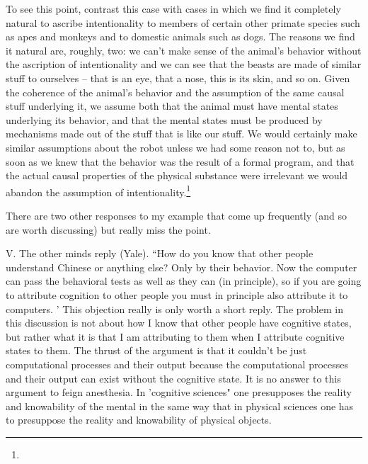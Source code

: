 To see this point, contrast this case with cases in which we find it completely natural to ascribe intentionality to
members of certain other primate species such as apes and monkeys and to domestic animals such as dogs. The
reasons we find it natural are, roughly, two: we can't make sense of the animal's behavior without the ascription
of intentionality and we can see that the beasts are made of similar stuff to ourselves -- that is an eye, that a
nose, this is its skin, and so on. Given the coherence of the animal's behavior and the assumption of the same
causal stuff underlying it, we assume both that the animal must have mental states underlying its behavior, and
that the mental states must be produced by mechanisms made out of the stuff that is like our stuff. We would
certainly make similar assumptions about the robot unless we had some reason not to, but as soon as we knew
that the behavior was the result of a formal program, and that the actual causal properties of the physical
substance were irrelevant we would abandon the assumption of intentionality.\footnote{}

There are two other responses to my example that come up frequently (and so are worth discussing) but really
miss the point.

V. The other minds reply (Yale). ``How do you know that other people understand Chinese or anything else?
Only by their behavior. Now the computer can pass the behavioral tests as well as they can (in principle), so if
you are going to attribute cognition to other people you must in principle also attribute it to computers. '
This objection really is only worth a short reply. The problem in this discussion is not about how I know that
other people have cognitive states, but rather what it is that I am attributing to them when I attribute cognitive
states to them. The thrust of the argument is that it couldn't be just computational processes and their output
because the computational processes and their output can exist without the cognitive state. It is no answer to
this argument to feign anesthesia. In 'cognitive sciences" one presupposes the reality and knowability of the
mental in the same way that in physical sciences one has to presuppose the reality and knowability of physical
objects.

